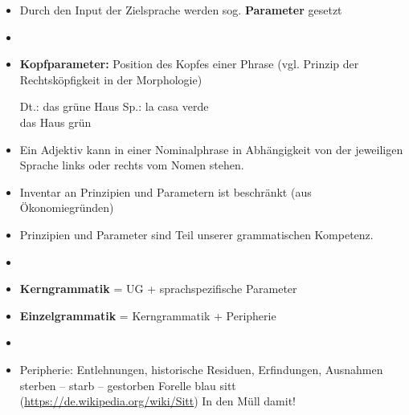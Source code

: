 \begin{frame}

\begin{itemize}

	\begin{block}{Parameter}
	Einzelsprachlich spezifische Regeln, die Möglichkeiten darstellen, die universalgrammatischen Prinzipien auszubuchstabieren.
	\end{block}
	
	\item Durch den Input der Zielsprache werden sog. \textbf{Parameter} gesetzt
	\item[]
	\item \textbf{Kopfparameter:} Position des Kopfes einer Phrase (vgl. Prinzip der Rechtsköpfigkeit in der Morphologie)
	
	\eal
	\ex Dt.: das grüne \alert{Haus}
	\ex
	\gll Sp.: la \alert{casa} verde\\
		{} das Haus grün\\
	\zl
	
	\item Ein Adjektiv kann in einer Nominalphrase in Abhängigkeit von der jeweiligen Sprache links oder rechts vom Nomen stehen.


\end{itemize}

\end{frame}


\begin{frame}

\begin{itemize}
	\item Inventar an Prinzipien und Parametern ist beschränkt (aus Ökonomiegründen)
	\item Prinzipien und Parameter sind Teil unserer grammatischen Kompetenz.
	\item[]
	\item \textbf{Kerngrammatik} = UG + sprachspezifische Parameter
	\item \textbf{Einzelgrammatik} = Kerngrammatik + Peripherie
	\item[]
	\item Peripherie: Entlehnungen, historische Residuen, Erfindungen, Ausnahmen \citep[vgl.][]{Nolda&Co14a}
	\eal
	\ex sterben -- starb -- gestorben
	\ex Forelle blau
	\ex sitt (\url{https://de.wikipedia.org/wiki/Sitt})
	\ex In den Müll damit!
	\zl
	
\end{itemize}

\end{frame}



